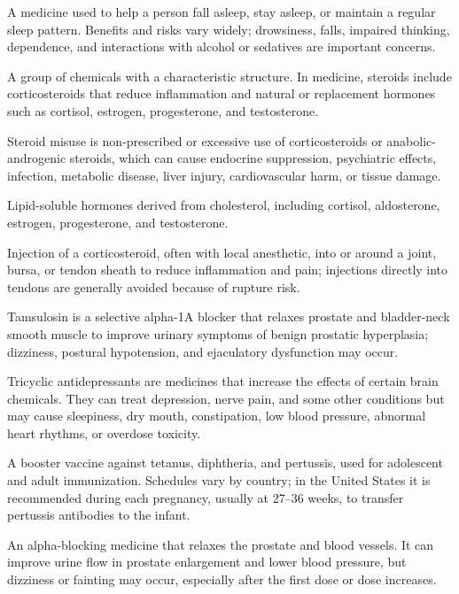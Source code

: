  A medicine used to help a person fall asleep, stay asleep, or maintain a regular sleep pattern. Benefits and risks vary widely; drowsiness, falls, impaired thinking, dependence, and interactions with alcohol or sedatives are important concerns.


 A group of chemicals with a characteristic structure. In medicine, steroids include corticosteroids that reduce inflammation and natural or replacement hormones such as cortisol, estrogen, progesterone, and testosterone.

 Steroid misuse is non-prescribed or excessive use of corticosteroids or anabolic-androgenic steroids, which can cause endocrine suppression, psychiatric effects, infection, metabolic disease, liver injury, cardiovascular harm, or tissue damage.

 Lipid-soluble hormones derived from cholesterol, including cortisol, aldosterone, estrogen, progesterone, and testosterone.

 Injection of a corticosteroid, often with local anesthetic, into or around a joint, bursa, or tendon sheath to reduce inflammation and pain; injections directly into tendons are generally avoided because of rupture risk.

 Tamsulosin is a selective alpha-1A blocker that relaxes prostate and bladder-neck smooth muscle to improve urinary symptoms of benign prostatic hyperplasia; dizziness, postural hypotension, and ejaculatory dysfunction may occur.

 Tricyclic antidepressants are medicines that increase the effects of certain brain chemicals. They can treat depression, nerve pain, and some other conditions but may cause sleepiness, dry mouth, constipation, low blood pressure, abnormal heart rhythms, or overdose toxicity.

 A booster vaccine against tetanus, diphtheria, and pertussis, used for adolescent and adult immunization. Schedules vary by country; in the United States it is recommended during each pregnancy, usually at 27–36 weeks, to transfer pertussis antibodies to the infant.


 An alpha-blocking medicine that relaxes the prostate and blood vessels. It can improve urine flow in prostate enlargement and lower blood pressure, but dizziness or fainting may occur, especially after the first dose or dose increases.

